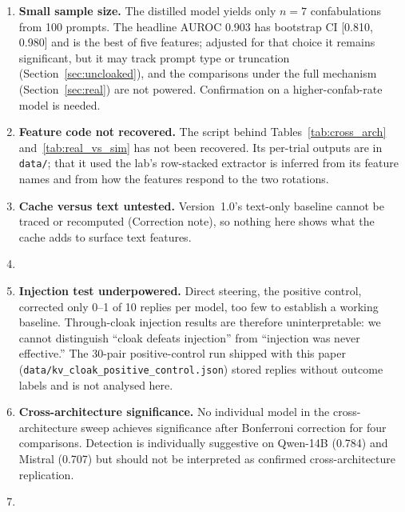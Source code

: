 \begin{enumerate}
\item \textbf{Small sample size.} The distilled model yields only
$n=7$ confabulations from 100 prompts. The headline AUROC 0.903 has
bootstrap CI [0.810, 0.980] and is the best of five features; adjusted for
that choice it remains significant, but it may track prompt type or
truncation (Section~\ref{sec:uncloaked}), and the comparisons under the full mechanism
(Section~\ref{sec:real}) are not powered. Confirmation on a
higher-confab-rate model is needed.

\item \textbf{Feature code not recovered.} The script behind
Tables~\ref{tab:cross_arch} and~\ref{tab:real_vs_sim} has not been
recovered. Its per-trial outputs are in \texttt{data/}; that it used the
lab's row-stacked extractor is inferred from its feature names and from
how the features respond to the two rotations.

\item \textbf{Cache versus text untested.} Version~1.0's text-only
baseline cannot be traced or recomputed (Correction note), so nothing here
shows what the cache adds to surface text features.

\item [unchanged v1.0 item cut: TEE trust assumption]

\item \textbf{Injection test underpowered.} Direct steering, the
positive control, corrected only 0--1 of 10 replies per model, too few to
establish a working baseline. Through-cloak injection results are
therefore uninterpretable: we cannot distinguish ``cloak defeats
injection'' from ``injection was never effective.'' The 30-pair
positive-control run shipped with this paper
(\nolinkurl{data/kv_cloak_positive_control.json}) stored replies without
outcome labels and is not analysed here.

\item \textbf{Cross-architecture significance.} No individual model in
the cross-architecture sweep achieves significance after Bonferroni
correction for four comparisons. Detection is individually suggestive on
Qwen-14B (0.784) and Mistral (0.707) but should not be interpreted as
confirmed cross-architecture replication.

\item [unchanged v1.0 item cut: adaptive adversary untested]

\end{enumerate}

